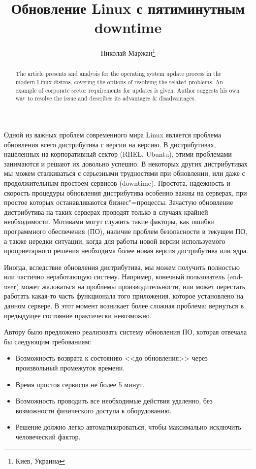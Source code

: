 \documentclass[10pt, a5paper]{article}
\begin{document}
\title{Обновление Linux с пятиминутным downtime}%

\author{Николай Маржан\footnote{Киев, Украина}}
\maketitle

\begin{abstract}
The article presents and analysis for the operating system update process in the modern Linux distros, covering the options of resolving the related problems. An example of corporate sector requirements for updates is given. Author suggests his own way to resolve the issue and describes its advantages \& disadvantages.
\end{abstract}


Одной из важных проблем современного мира Linux является проблема обновления всего дистрибутива с версии на версию. В дистрибутивах, нацеленных на корпоративный сектор (RHEL, Ubuntu), этими проблемами занимаются и решают их довольно успешно. В некоторых других дистрибутивах мы можем сталкиваться с серьезными трудностями при обновлении, или даже с продолжительным простоем сервисов (downtime). Простота, надежность и скорость процедуры обновления дистрибутива особенно \linebreak важны на серверах, при простое которых останавливаются бизнес"=процессы. Зачастую обновление дистрибутива на таких серверах проводят только в случаях крайней необходимости. Мотивами могут служить такие факторы, как ошибки программного обеспечения (ПО), наличие проблем безопасности в текущем ПО, а также нередки ситуации, когда для работы новой версии используемого проприетарного решения необходима более новая версия дистрибутива или ядра.

Иногда, вследствие обновления дистрибутива, мы можем получить полностью или частично неработающую систему. Например, конечный пользователь (end-user) может жаловаться на проблемы производительности, или может перестать работать какая-то часть функционала того приложения, которое установлено на данном сервере. В этот момент возникает более сложная проблема: вернуться в предыдущее состояние практически невозможно.

Автору было предложено реализовать систему обновления ПО, которая отвечала бы следующим требованиям:

\begin{itemize}
  \item Возможность возврата к состоянию <<до обновления>> через произвольный промежуток времени.
  \item Время простоя сервисов не более 5 минут.
  \item Возможность проводить все необходимые действия удаленно, без возможности физического доступа к оборудованию.
  \item Решение должно легко автоматизироваться, чтобы максимально исключить человеческий фактор.
\end{itemize}
\end{document}
